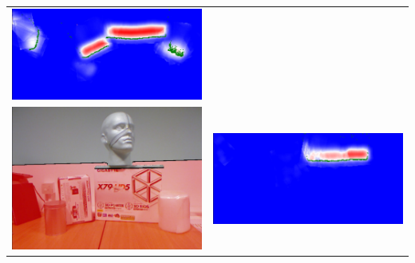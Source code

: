 \documentclass[10pt,onecolumn,letterpaper]{article}
\begin{document}
\begin{tabular}{cc}
\includegraphics[height=\imheight]{real/head/slice_00080.jpg} \\
\includegraphics[height=\imheight]{real/head/rgb_00110.jpg} &
\includegraphics[height=\imheight]{real/head/slice_00110.jpg} \\

\end{tabular}
\end{document}
